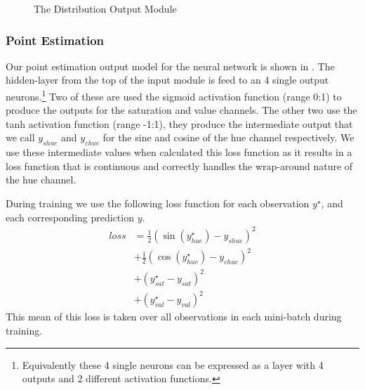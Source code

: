 \documentclass[11pt,a4paper]{article}
\begin{document}
\begin{figure}
	\newcommand{\picwidth}{60pt}
	
	\caption{The Distribution Output Module \label{fig:distoutmod}}
\end{figure}
	

\subsubsection{Point Estimation}\label{sec:point-estimation}
Our point estimation output model for the neural network is shown in .
The hidden-layer from the top of the input module is feed to an 4 single output neurons.\footnote{Equivalently these 4 single neurons can be expressed as a layer with 4 outputs and 2 different activation functions.}
Two of these are used the sigmoid activation function (range 0:1) to produce the outputs for the saturation and value channels.
The other two use the tanh activation function (range -1:1), they produce the intermediate output that we call $y_{shue}$ and $y_{chue}$ for the sine and cosine of the hue channel respectively.
We use these intermediate values when calculated this loss function as it results in a loss function that is continuous and correctly handles the wrap-around nature of the hue channel.

During training we use the following loss function for each observation $y^\star$, and each corresponding prediction $y$.
\begin{align}
loss &= %
\frac{1}{2} \left(\sin(y^\star_{hue}) - y_{shue} \right)^2     \nonumber \\
&+ \frac{1}{2} \left(\cos(y^\star_{hue}) - y_{chue} \right)^2  \nonumber \\
&+ \left(y^\star_{sat} - y_{sat} \right)^2  \nonumber \\
&+ \left(y^\star_{val} - y_{val} \right)^2 %
\end{align}
This mean of this loss is taken over all observations in each mini-batch during training.
\end{document}
